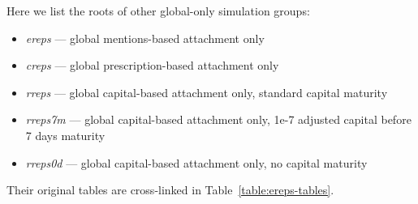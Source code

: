 \documentclass[10pt,oneside]{memoir}
\begin{document}
Here we list the roots of other global-only simulation groups:


\begin{itemize}


\item {\itshape ereps} --- global mentions-based attachment only

\item {\itshape creps} --- global prescription-based attachment only

\item {\itshape rreps} --- global capital-based attachment only, standard capital maturity

\item {\itshape rreps7m} --- global capital-based attachment only,  1e-7 adjusted capital before 7 days maturity

\item {\itshape rreps0d} --- global capital-based attachment only, no capital maturity
\end{itemize}

Their original tables are cross-linked in Table~\ref{table:ereps-tables}.
\end{document}
